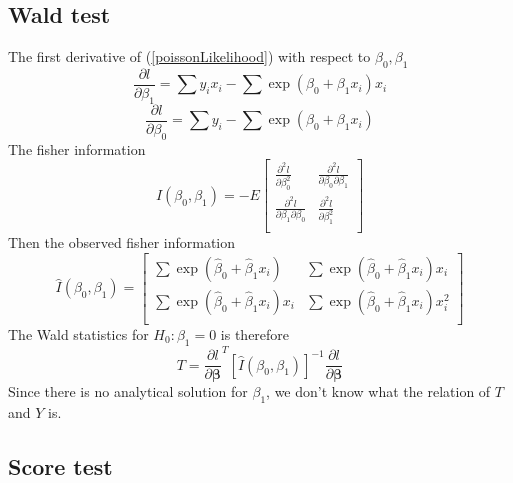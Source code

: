 \documentclass[12pt,oneside]{book}
\begin{document}
\subsection*{Wald test}
The first derivative of (\ref{poissonLikelihood}) with respect to $\beta_0, \beta_1$
\[ \frac{\partial l}{\partial \beta_1} = \sum y_ix_i - \sum \exp(\beta_0 +\beta_1x_i)x_i\]
\[\frac{\partial l}{\partial \beta_0} = \sum y_i - \sum \exp(\beta_0 +\beta_1x_i)\]
The fisher information 
\[
I(\beta_0, \beta_1) = -E
\left[
\begin{array}{cc}
\frac{\partial^2 l }{\partial\beta_0^2} & \frac{\partial^2 l }{\partial\beta_0\partial \beta_1} \\
\frac{\partial^2 l }{\partial\beta_1\partial\beta_0} &  \frac{\partial^2 l }{\partial\beta_1^2} \\
\end{array}\right]
\]
Then the observed fisher information 
\[
\hat{I}(\beta_0, \beta_1) = 
\left[
\begin{array}{cc}
\sum \exp (\hat{\beta}_0 + \hat{\beta}_1 x_i)& \sum \exp (\hat{\beta}_0 + \hat{\beta}_1 x_i)x_i\\
\sum \exp (\hat{\beta}_0 + \hat{\beta}_1 x_i)x_i & \sum \exp (\hat{\beta}_0 + \hat{\beta}_1 x_i)x_i^2  \\
\end{array}\right]
\]
The Wald statistics for $H_0: \beta_1=0$ is therefore 
\[T = \frac{\partial l}{\partial \bm \beta} ^T [\hat{I}(\beta_0, \beta_1)]^{-1}  \frac{\partial l}{\partial \bm \beta}\]
Since there is no analytical solution for $\beta_1$, we don't know what the relation of $T$ and $Y$ is.

\subsection*{Score test} 
\end{document}
